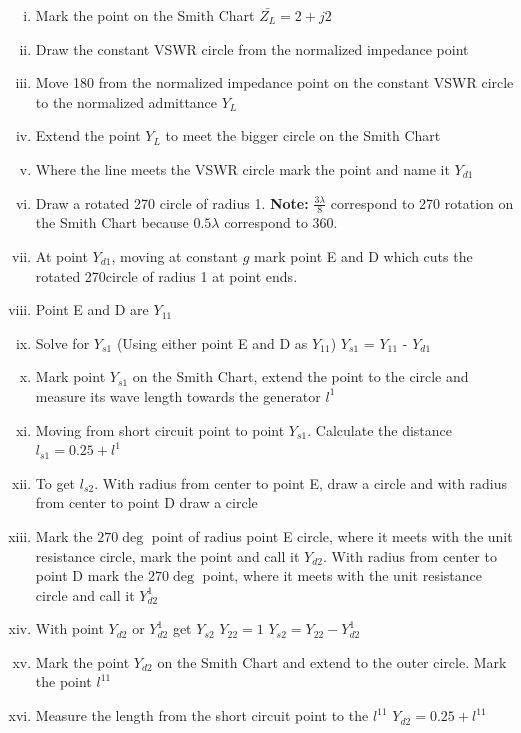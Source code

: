 \begin{exmp}
\begin{enumerate}[(i)]
\item Mark the point on the Smith Chart $\bar{Z_{L}} = 2 + j2$  
\item Draw the constant VSWR circle from the normalized impedance point
\item Move 180\textdegree\; from the normalized impedance point on the constant VSWR circle to the normalized admittance $Y_{L}$
\item Extend the point $Y_{L}$ to meet the bigger circle on the Smith Chart 
\item Where the line meets the VSWR circle mark the point and name it $Y_{d1}$            
\item Draw a rotated 270\textdegree\; circle of radius 1. \textbf{Note:} $\frac{3\lambda}{8}$ correspond to 270\textdegree\; rotation on the Smith Chart because $0.5\lambda$ correspond to 360\textdegree.
\item At point $Y_{d1}$, moving at constant $g$ mark point E and D which cuts the rotated 270\textdegree circle of radius 1 at point ends.
\item Point E and D are $Y_{11}$                        
\item Solve for $Y_{s1}$ (Using either point E and D as $Y_{11}$) $Y_{s1}$ =  $Y_{11}$ -  $Y_{d1}$           
\item Mark point $Y_{s1}$ on the Smith Chart, extend the point to the circle and measure its wave length towards the generator $l^{1}$ 
\item Moving from short circuit point to point $Y_{s1}$. Calculate the distance
$ l_{s1} = 0.25 + l^{1} $                                    
\item To get $l_{s2}$. With radius from center to point E, draw a circle and with radius from center to point D draw a circle
\item Mark the $270\deg$ point of radius point E circle, where it meets with the unit resistance circle, mark the point and call it $Y_{d2}$. With radius from center to point D mark the $270\deg$ point, where it meets with the unit resistance circle and call it $Y_{d2}^{1}$ 
\item With point $Y_{d2}$ or $Y_{d2}^{1}$ get $Y_{s2}$ $Y_{22}=1$ $Y_{s2}=Y_{22}-Y_{d2}^{1}$
\item Mark the point $Y_{d2}$ on the Smith Chart and extend to the outer circle. Mark the point $l^{11}$
\item Measure the length from the short circuit point to the $l^{11}$ $Y_{d2} = 0.25 + l^{11}$
\end{enumerate}
\end{exmp}

